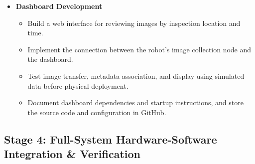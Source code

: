 \documentclass{article}
\begin{document}
\begin{itemize}
	\item \textbf{Dashboard Development}
	\begin{itemize}
		\item Build a web interface for reviewing images by inspection location and time.
		\item Implement the connection between the robot's image collection node and the dashboard.
		\item Test image transfer, metadata association, and display using simulated data before physical deployment.
		\item Document dashboard dependencies and startup instructions, and store the source code and configuration in GitHub.
	\end{itemize}
\end{itemize}


\subsection{Stage 4: Full-System Hardware-Software Integration \& Verification}
\end{document}
